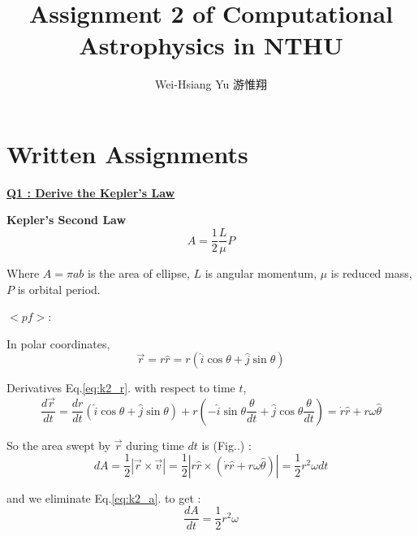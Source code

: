 \documentclass{article}
\title{Assignment 2 of Computational Astrophysics in NTHU}
\author{Wei-Hsiang Yu 游惟翔}
\begin{document}
\begin{CJK}{UTF8}{bsmi}
\maketitle
\end{CJK}


\section{Written Assignments}

\underline{\textbf{Q1 : Derive the Kepler’s Law\\}}

\textbf{Kepler’s Second Law}
\begin{equation}
    A = \frac{1}{2}\frac{L}{\mu}P
    \label{eq:k2}
\end{equation}

Where $A=\pi ab$ is the area of ellipse, $L$ is angular momentum, $\mu$ is reduced mass, $P$ is orbital period.

$<pf> :$

In polar coordinates,
\begin{equation}
    \vec{r} = r\hat{r} = r(\hat{i}\cos{\theta}+\hat{j}\sin{\theta})
    \label{eq:k2_r}
\end{equation}

Derivatives Eq.\ref{eq:k2_r}. with respect to time $t$,
\begin{equation}
    \frac{d\vec{r}}{dt} = \frac{dr}{dt}(\hat{i}\cos{\theta}+\hat{j}\sin{\theta}) 
    + r(-\hat{i}\sin{\theta}\frac{\theta}{dt}+\hat{j}\cos{\theta}\frac{\theta}{dt})
    =\dot{r}\hat{r}+r\omega\hat{\theta}
    \label{eq:k2_r'}
\end{equation}

So the area swept by $\vec{r}$ during time $dt$ is (Fig..) :
\begin{equation}
    dA = \frac{1}{2}\left|\vec{r}\times\vec{v}\right|
    = \frac{1}{2}\left|r\hat{r}\times(\dot{r}\hat{r}+r\omega\hat{\theta})\right|
    = \frac{1}{2}r^2\omega dt
    \label{eq:k2_a}
\end{equation}

and we eliminate Eq.\ref{eq:k2_a}. to get :
\begin{equation*}
    \frac{dA}{dt} = \frac{1}{2}r^2\omega
    \label{eq:k2_a'}
\end{equation*}
\end{document}
